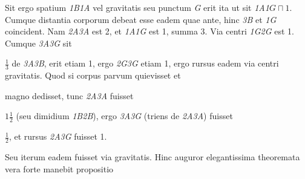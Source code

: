 %
Sit ergo spatium \textit{\scriptsize 1}\textit{B}\textit{\scriptsize 1}\textit{A} vel 
%
%
gravitatis\protect{} seu punctum \textit{G} erit ita ut sit \textit{\scriptsize 1}\textit{A}\textit{\scriptsize 1}$G \sqcap 1$. 
%
Cumque distantia corporum\protect{} debeat esse eadem quae ante, hinc \textit{\scriptsize 3}\textit{B} et
%
\textit{\scriptsize 1}\textit{G} coincident. Nam \textit{\scriptsize 2}\textit{A}\textit{\scriptsize 3}\textit{A} est 2, et \textit{\scriptsize 1}\textit{A}\textit{\scriptsize 1}\textit{G} est 1, summa 3. 
%
Via centri\protect{} \textit{\scriptsize 1}\textit{G}\textit{\scriptsize 2}\textit{G} est 1. 
%
Cumque \textit{\scriptsize 3}\textit{A}\textit{\scriptsize 3}\textit{G} sit \protect\rule[0cm]{0mm}{16pt}$\displaystyle\frac{1}{3}$ de \textit{\scriptsize 3}\textit{A}\textit{\scriptsize 3}\textit{B}, 
%
erit etiam 1, ergo \textit{\scriptsize 2}\textit{G}\textit{\scriptsize 3}\textit{G} etiam 1, ergo rursus eadem via centri gravitatis.\protect{} 
%
Quod si corpus parvum quievisset et 
%
\protect\rule[0cm]{0mm}{10pt} 
%
magno dedisset, tunc \textit{\scriptsize 2}\textit{A}\textit{\scriptsize 3}\textit{A} fuisset \protect\rule[0cm]{0mm}{16pt}$1\displaystyle\frac{1}{2}$ 
%
(seu dimidium \textit{\scriptsize 1}\textit{B}\textit{\scriptsize 2}\textit{B}), 
%
ergo \textit{\scriptsize 3}\textit{A}\textit{\scriptsize 3}\textit{G} (triens de \textit{\scriptsize 2}\textit{A}\textit{\scriptsize 3}\textit{A})
%
fuisset \protect\rule[0cm]{0mm}{16pt}$\displaystyle\frac{1}{2}$, et rursus \textit{\scriptsize 2}\textit{A}\textit{\scriptsize 3}\textit{G} fuisset 1. \protect\rule[0cm]{0mm}{10pt}Seu iterum eadem fuisset via 
%
%
gravitatis.\protect{}
%
\pend \pstart 
%
Hinc auguror elegantissima theoremata 
%
%
vera forte manebit propositio
